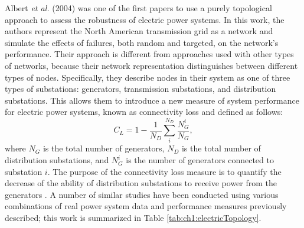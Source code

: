 Albert \emph{et al.} (2004) \cite{Albert2004} was one of the first papers to use a purely topological approach to assess the robustness of electric power systems.  In this work, the authors represent the North American transmission grid as a network and simulate the effects of failures, both random and targeted, on the network's performance.  Their approach is  different from approaches used with other types of networks, because their network representation distinguishes between different types of nodes. Specifically, they describe nodes in their system as one of three types of substations: generators, transmission substations, and distribution substations.  This allows them to introduce a new measure of system performance for electric power systems, known as connectivity loss and defined as follows:
%
\begin{equation}
C_L=1-\frac{1}{N_{D}}\sum\limits_{i}^{N_{D}} \frac{N_{G}^{i}}{N_{G}},
\end{equation}
%
where $N_{G}$ is the total number of generators, $N_{D}$ is the total number of distribution substations, and $N_{G}^{i}$ is the number of generators connected to substation $i$.  The purpose of the connectivity loss measure is to quantify the decrease of the ability of distribution substations to receive power from the generators \cite{Albert2004}. A number of similar studies have been conducted using various combinations of real power system data and performance measures previously described; this work is summarized in Table \ref{tab:ch1:electricTopology}.


